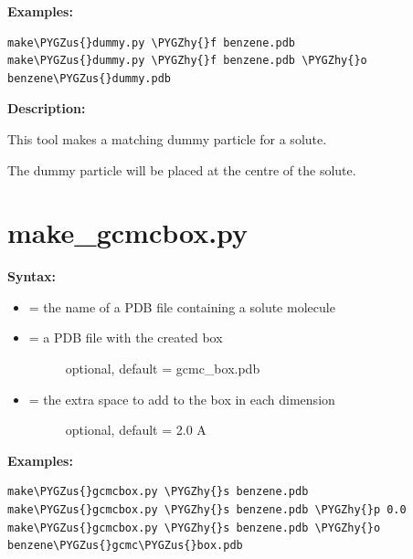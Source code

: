 \documentclass[letterpaper,10pt,english]{sphinxmanual}
\def\PYGZus{\char`\_}
\def\PYGZhy{\char`\-}
\begin{document}
\textbf{Examples:}

\begin{Verbatim}[commandchars=\\\{\}]
make\PYGZus{}dummy.py \PYGZhy{}f benzene.pdb
make\PYGZus{}dummy.py \PYGZhy{}f benzene.pdb \PYGZhy{}o benzene\PYGZus{}dummy.pdb
\end{Verbatim}

\textbf{Description:}

This tool makes a matching dummy particle for a solute.

The dummy particle will be placed at the centre of the solute.


\section{make\_gcmcbox.py}
\label{tools:make-gcmcbox-py}
\textbf{Syntax:}

\begin{itemize}
\item {} 
 = the name of a PDB file containing a solute molecule

\item {} \begin{description}
\item[{ = a PDB file with the created box}] \leavevmode
optional, default = gcmc\_box.pdb

\end{description}

\item {} \begin{description}
\item[{ = the extra space to add to the box in each dimension}] \leavevmode
optional, default = 2.0 A

\end{description}

\end{itemize}

\textbf{Examples:}

\begin{Verbatim}[commandchars=\\\{\}]
make\PYGZus{}gcmcbox.py \PYGZhy{}s benzene.pdb
make\PYGZus{}gcmcbox.py \PYGZhy{}s benzene.pdb \PYGZhy{}p 0.0
make\PYGZus{}gcmcbox.py \PYGZhy{}s benzene.pdb \PYGZhy{}o benzene\PYGZus{}gcmc\PYGZus{}box.pdb
\end{Verbatim}
\end{document}
